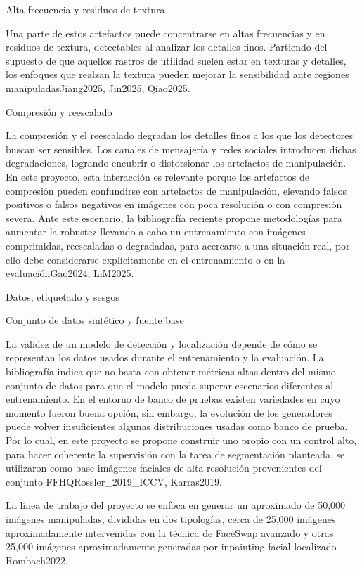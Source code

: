Alta frecuencia y residuos de textura

Una parte de estos artefactos puede concentrarse en altas frecuencias y en residuos de textura, detectables al analizar los detalles finos. Partiendo del supuesto de que aquellos rastros de utilidad suelen estar en texturas y detalles, los enfoques que realzan la textura pueden mejorar la sensibilidad ante regiones manipuladasJiang2025, Jin2025, Qiao2025.

Compresión y reescalado

La compresión y el reescalado degradan los detalles finos a los que los detectores buscan ser sensibles. Los canales de mensajería y redes sociales introducen dichas degradaciones, logrando encubrir o distorsionar los artefactos de manipulación. En este proyecto, esta interacción es relevante porque los artefactos de compresión pueden confundirse con artefactos de manipulación, elevando falsos positivos o falsos negativos en imágenes con poca resolución o con compresión severa. Ante este escenario, la bibliografía reciente propone metodologías para aumentar la robustez llevando a cabo un entrenamiento con imágenes comprimidas, reescaladas o degradadas, para acercarse a una situación real, por ello debe considerarse explícitamente en el entrenamiento o en la evaluaciónGao2024, LiM2025. 

Datos, etiquetado y sesgos

Conjunto de datos sintético y fuente base

La validez de un modelo de detección y localización depende de cómo se representan los datos usados durante el entrenamiento y la evaluación. La bibliografía indica que no basta con obtener métricas altas dentro del mismo conjunto de datos para que el modelo pueda superar escenarios diferentes al entrenamiento. En el entorno de banco de pruebas existen variedades en cuyo momento fueron buena opción, sin embargo, la evolución de los generadores puede volver insuficientes algunas distribuciones usadas como banco de prueba. Por lo cual, en este proyecto se propone construir uno propio con un control alto, para hacer coherente la supervisión con la tarea de segmentación planteada, se utilizaron como base imágenes faciales de alta resolución provenientes del conjunto FFHQRossler_2019_ICCV, Karras2019.

La línea de trabajo del proyecto se enfoca en generar un aproximado de 50,000 imágenes manipuladas, divididas en dos tipologías, cerca de 25,000 imágenes aproximadamente intervenidas con la técnica de FaceSwap avanzado y otras 25,000 imágenes aproximadamente generadas por inpainting facial localizado Rombach2022.

